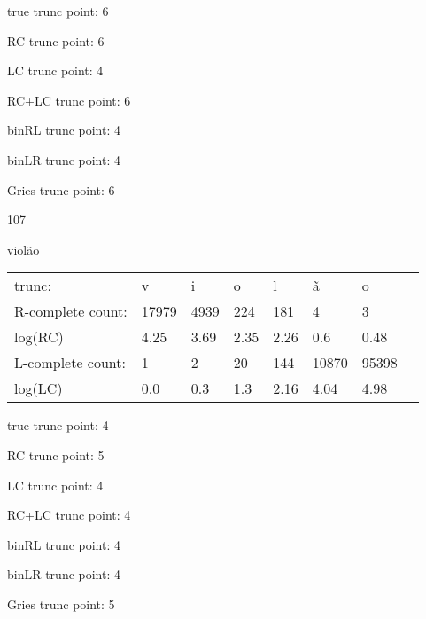 \documentclass[10pt]{article}
\begin{document}
true trunc point: 6

RC trunc point: 6

LC trunc point: 4

RC+LC trunc point: 6

binRL trunc point: 4

binLR trunc point: 4

Gries trunc point: 6

\vspace{1em}

107

violão

\begin{tabular}{l|lllllll}
trunc: & v & i & o & l & ã & o & \\ 
R-complete count: & 17979 & 4939 & 224 & 181 & 4 & 3 & \\ 
log(RC) & 4.25 & 3.69 & 2.35 & 2.26 & 0.6 & 0.48 & \\ 
L-complete count: & 1 & 2 & 20 & 144 & 10870 & 95398 & \\ 
log(LC) & 0.0 & 0.3 & 1.3 & 2.16 & 4.04 & 4.98 & \\ 
\end{tabular}

true trunc point: 4

RC trunc point: 5

LC trunc point: 4

RC+LC trunc point: 4

binRL trunc point: 4

binLR trunc point: 4

Gries trunc point: 5

\vspace{1em}
\end{document}
